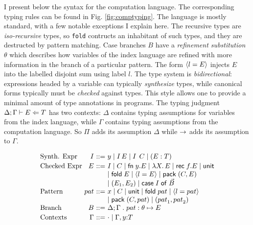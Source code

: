 \documentclass{article}
\begin{document}
I present below the syntax for the computation language. The
corresponding typing rules can be found in
Fig. \ref{fig:comptyping}. The language
is mostly standard, with a few notable exceptions I explain here. The
recursive types are \emph{iso-recursive}
types, so \lstinline{fold} contructs an inhabitant of such types, and
they are destructed by pattern matching. Case branches $B$ have a
\emph{refinement substitution} $\theta$ which describes how variables
of the index language are refined with more information in the branch
of a particular pattern. The form $\langle l=E \rangle$ injects $E$ into the
labelled disjoint sum using label $l$. The type system is \emph{bidirectional}:
expressions headed by a variable can typically \emph{synthesize}
types, while canonical forms typically must be \emph{checked} against
types. This style allows one to provide a minimal amount of type
annotations in programs. The typing judgment $\Delta;\Gamma \vdash E
\Leftarrow T$ has two contexts: $\Delta$ contains typing assumptions for variables from the index
language, while $\Gamma$ contains typing assumptions from the
computation language. So $\Pi$ adds its assumption $\Delta$ while
$\rightarrow$ adds its assumption to $\Gamma$.

\[
\begin{array}{l@{~}r@{~}c@{~}l}
\mbox{Synth. Expr} & I  & \bnfas & y 
  \bnfalt \app I E %
  \bnfalt \app I \ctxi C 
   \bnfalt  (E : T)
\\[2pt]
\mbox{Checked Expr} & E & \bnfas &  I 
  \bnfalt C %
  \bnfalt \fn{y}{E}
  \bnfalt \mlam{X}{E} 
  \bnfalt \rec{f}{E} 
  \bnfalt \m{unit}\\
& & &   \bnfalt \fold E  \bnfalt \dsum{l=E}   \bnfalt \pack (C , E) \\
&&&  \bnfalt (E_1, E_2) \bnfalt \casebox{I}{\vec{B}} \\
\mbox{Pattern } & {pat} & \bnfas & x \bnfalt C \bnfalt \m{unit} \bnfalt \fold {pat} \bnfalt \dsum{l = {pat}} \\
                         &          &            & \bnfalt \pack (C , {pat}) \bnfalt ({pat}_1, {pat}_2)\\
\mbox{Branch  } & B  & \bnfas &  \casearm{\Delta ; \Gamma\;.\; pat : \theta}{E}
\\[2pt]
\mbox{Contexts} & \Gamma  & \bnfas &  \edot \bnfalt \Gamma, y{:}T \\
\end{array}
\]  
\end{document}
